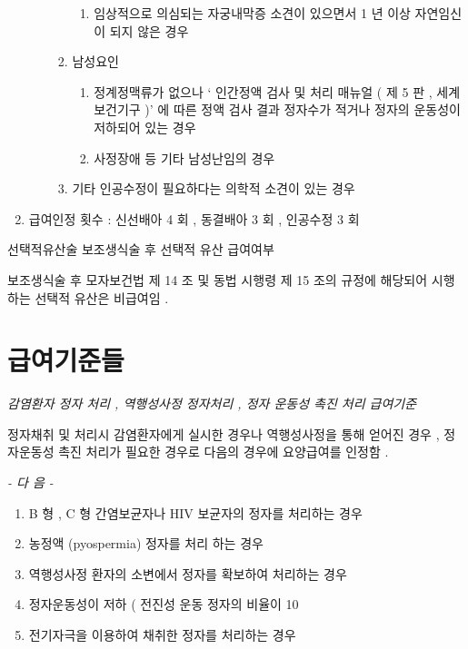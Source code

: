 \begin{enumerate}[가.]
\begin{enumerate}[1)]
\begin{enumerate}[가)]
\begin{enumerate}[(1)]
			\item 임상적으로 의심되는 자궁내막증 소견이 있으면서  1 년  이상 자연임신이 되지 않은 경우 
			\end{enumerate}		
		\item 남성요인 
			\begin{enumerate}[(1)]\tightlist
			\item 정계정맥류가 없으나  ‘ 인간정액 검사 및 처리 매뉴얼 ( 제 5 판 ,  세계보건기구 )’ 에 따른 정액 검사 결과 정자수가 적거나 정자의 운동성이 저하되어  있는 경우 
			\item 사정장애 등 기타 남성난임의 경우 
			\end{enumerate}
		\item 기타 인공수정이 필요하다는 의학적 소견이 있는 경우 
		\end{enumerate}
   \end{enumerate}
\item 급여인정 횟수 :  신선배아  4 회 ,  동결배아  3 회 ,  인공수정  3 회  
\end{enumerate}
 

\begin{commentbox}{선택적유산술} 
보조생식술 후 선택적 유산 급여여부\par 
보조생식술 후 모자보건법 제 14 조 및 동법 시행령 제 15 조의  규정에  해당되어 시행하는 선택적 유산은 비급여임 . 
\end{commentbox}
 
\section{급여기준들}
\par 
\emph{감염환자 정자 처리 ,  역행성사정  정자처리 ,  정자 운동성 촉진 처리  급여기준} \par
정자채취 및 처리시 감염환자에게 실시한 경우나 역행성사정을 통해 얻어진 경우 ,  정자운동성 촉진 처리가 필요한 경우로 다음의 경우에 요양급여를 인정함 . \par
\emph{-  다 음  -}\par  
\begin{enumerate}[가.]\tightlist
\item B 형 , C 형 간염보균자나  HIV  보균자의 정자를 처리하는 경우 
\item 농정액 (pyospermia)  정자를 처리 하는 경우 
\item 역행성사정 환자의 소변에서 정자를 확보하여 처리하는 경우 
\item 정자운동성이 저하 ( 전진성 운동 정자의 비율이  10%
\item 전기자극을 이용하여 채취한 정자를 처리하는 경우 
\end{enumerate}

